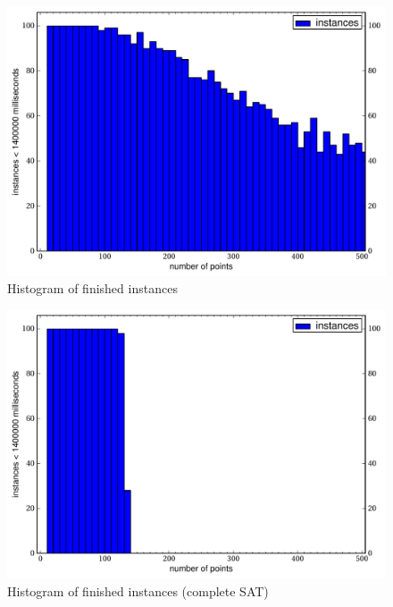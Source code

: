 \begin{landscape}
\begin{figure}[ht]
  \centering
  \includegraphics[width=\linewidth,height=\textheight,keepaspectratio]{results/time_hist.pdf}
  \caption{\label{fig:times_hist}Histogram of finished instances}
\end{figure}

\begin{figure}[ht]
  \centering
  \includegraphics[width=\linewidth,height=\textheight,keepaspectratio]{results/complete_sat/time_hist.pdf}
  \caption{Histogram of finished instances (complete SAT)}
\end{figure}
\end{landscape}
\restoregeometry
